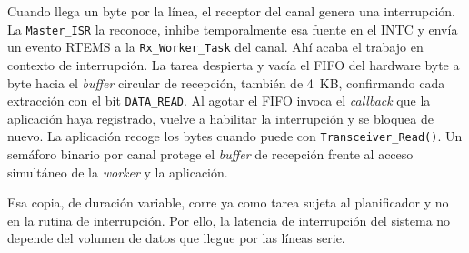 Cuando llega un byte por la línea, el receptor del canal genera una interrupción. La
\texttt{Master\_ISR} la reconoce, inhibe temporalmente esa fuente en el INTC y envía un evento
RTEMS a la \texttt{Rx\_Worker\_Task} del canal. Ahí acaba el trabajo en contexto de interrupción. La
tarea despierta y vacía el FIFO del hardware byte a byte hacia el \textit{buffer} circular de
recepción, también de 4~KB, confirmando cada extracción con el bit \texttt{DATA\_READ}. Al agotar el
FIFO invoca el \textit{callback} que la aplicación haya registrado, vuelve a habilitar la
interrupción y se bloquea de nuevo. La aplicación recoge los bytes cuando puede con
\texttt{Transceiver\_Read()}. Un semáforo binario por canal protege el \textit{buffer} de recepción
frente al acceso simultáneo de la \textit{worker} y la aplicación.

Esa copia, de duración variable, corre ya como tarea sujeta al planificador y no en la rutina de
interrupción. Por ello, la latencia de interrupción del sistema no depende del volumen de datos
que llegue por las líneas serie.
